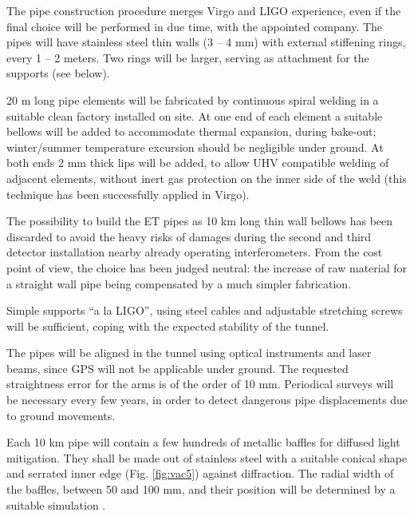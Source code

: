 The pipe construction procedure merges Virgo and LIGO experience, even if the final choice will be performed in due time, with the appointed company. The pipes will have stainless steel thin walls (3 -- 4 mm) with external stiffening rings, every 1 -- 2 meters. Two rings will be larger, serving as attachment for the supports (see below).

20 m long pipe elements will be fabricated by continuous spiral welding in a suitable clean factory installed on site. At one end of each element a suitable bellows will be added to accommodate thermal expansion, during bake-out; winter/summer temperature excursion should be negligible under ground. At both ends 2 mm thick lips will be added, to allow UHV compatible welding of adjacent elements, without inert gas protection on the inner side of the weld (this technique has been successfully applied in Virgo).

The possibility to build the ET pipes as 10 km long thin wall bellows has been discarded to avoid the heavy risks of damages during the second and third detector installation nearby already operating interferometers. From the cost point of view, the choice has been judged neutral: the increase of raw material for a straight wall pipe being compensated by a much simpler fabrication.

Simple supports ``a la LIGO'', using steel cables and adjustable stretching screws will be sufficient, coping with the expected stability of the tunnel.

The pipes will be aligned in the tunnel using optical instruments and laser beams, since GPS will not be applicable under ground. The requested straightness error for the arms is of the order of 10 mm. Periodical surveys will be necessary every few years, in order to detect dangerous pipe displacements due to ground movements.

Each 10 km pipe will contain a few hundreds of metallic baffles for diffused light mitigation. They shall be made out of stainless steel with a suitable conical shape and serrated inner edge (Fig. \ref{fig:vac5}) against diffraction. The radial width of the baffles, between 50 and 100 mm, and their position will be determined by a suitable simulation \cite{vinet97} \cite{vinet96}.

